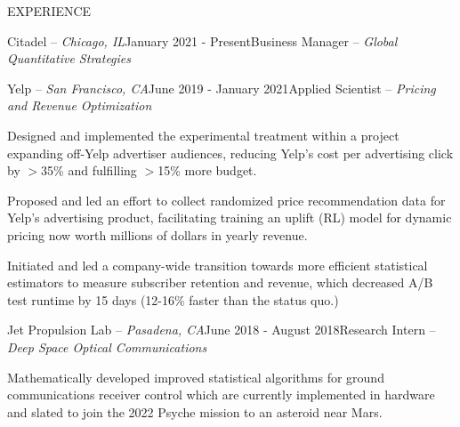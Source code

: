 \documentclass{resume} %
\begin{document}
 

\vspace{-1em}
\begin{rSection}{EXPERIENCE}


\begin{rSubsection}{Citadel -- {\it Chicago, IL}}{January 2021 - Present}{Business Manager -- {\sl Global Quantitative Strategies}}

\item[]
\vspace{-2em}

\end{rSubsection}

\begin{rSubsection}{Yelp -- {\it San Francisco, CA}}{June 2019 - January 2021}{Applied Scientist -- {\sl Pricing and Revenue Optimization}}

\item Designed and implemented the experimental treatment within a project expanding off-Yelp advertiser audiences, reducing Yelp's cost per advertising click by $>$35\% and fulfilling $>$15\% more budget.

\item Proposed and led an effort to collect randomized price recommendation data for Yelp's advertising product, facilitating training an uplift (RL) model for dynamic pricing now worth millions of dollars in yearly revenue.

\item Initiated and led a company-wide transition towards more efficient statistical estimators to measure subscriber retention and revenue, which decreased A/B test runtime by 15 days (12-16\% faster than the status quo.)

\end{rSubsection}

\begin{rSubsection}{Jet Propulsion Lab -- {\it Pasadena, CA}}{June 2018 - August 2018}{Research Intern -- {\sl Deep Space Optical Communications}}

\item Mathematically developed improved statistical algorithms for ground communications receiver control which are currently implemented in hardware and slated to join the 2022 Psyche mission to an asteroid near Mars.
\end{rSubsection}


\end{rSection}
\end{document}
